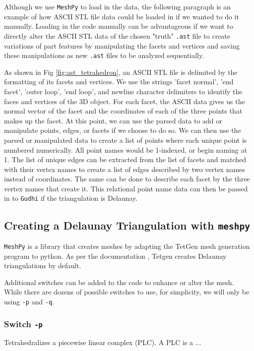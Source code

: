 \documentclass[ma]{uncgdissertationexp}
\theoremstyle{plain}
\theoremstyle{definition}
\theoremstyle{remark}
\begin{document}
\par Although we use \verb"MeshPy" to load in the data, the following paragraph is an example of how ASCII STL file data could be loaded in if we wanted to do it manually. Loading in the code manually can be advantageous if we want to directly alter the ASCII STL data of the chosen "truth" \verb".ast" file to create variations of part features by manipulating the facets and vertices and saving these manipulations as new \verb".ast" files to be analyzed sequentially.

\par As shown in Fig \ref{fig:ast_tetrahedron}, an ASCII STL file is delimited by the formatting of its facets and vertices. We use the strings 'facet normal', 'end facet', 'outer loop', 'end loop', and newline character delimiters to identify the faces and vertices of the 3D object. For each facet, the ASCII data gives us the normal vector of the facet and the coordinates of each of the three points that makes up the facet. At this point, we can use the parsed data to add or manipulate points, edges, or facets if we choose to do so. We can then use the parsed or manipulated data to create a list of points where each unique point is numbered numerically. All point names would be 1-indexed, or begin naming at 1. The list of unique edges can be extracted from the list of facets and matched with their vertex names to create a list of edges described by two vertex names instead of coordinates. The same can be done to describe each facet by the three vertex names that create it. This relational point name data can then be passed in to \verb"Gudhi" if the triangulation is Delaunay.

\cprotect\subsection{Creating a Delaunay Triangulation with \verb+meshpy+}
\label{sec:implement_meshpy}
\par \verb"MeshPy" is a library that creates meshes by adapting the TetGen mesh generation program to python. As per the documentation \cite{tetgen}, Tetgen creates Delaunay triangulations by default.

\par Additional switches can be added to the code to enhance or alter the mesh. While there are dozens of possible switches to use, for simplicity, we will only be using \verb"-p" and \verb"-q".

\cprotect\subsubsection{Switch \verb+-p+}
Tetrahedralizes a piecewise linear complex (PLC). A PLC is a ...
\end{document}
